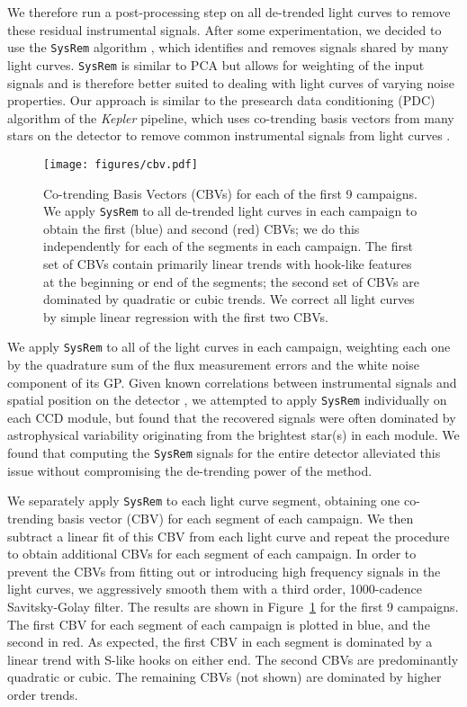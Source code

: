 \documentclass[]{aastex62}
\newcommand{\edited}[1]{{\color{red} #1}}
\begin{document}
We therefore run a post-processing step on all de-trended light curves to remove these
residual instrumental signals. After some experimentation, we decided to use the
\texttt{SysRem} algorithm \citep{Tamuz05}, which identifies and removes signals shared by many
light curves. \texttt{SysRem} is similar to PCA but allows for weighting of the input
signals and is therefore better suited to dealing with light curves of varying noise
properties. Our approach is similar to the presearch data conditioning (PDC) algorithm
of the \emph{Kepler} pipeline, which uses co-trending basis vectors from many stars
on the detector to remove common instrumental signals from light curves \citep{Stumpe12,Smith12}.

\begin{figure}[hbt]
  \begin{center}
      \texttt{[image: figures/cbv.pdf]}
      \caption{Co-trending Basis Vectors (CBVs) for each of the first 9 campaigns.
         We apply \texttt{SysRem} to all de-trended light curves
         in each campaign to obtain the first (blue) and second (red) CBVs; we do this
         independently for each of the segments in each campaign.
         The first set of CBVs contain primarily linear trends with hook-like
         features at the beginning or end of the segments; the second set of CBVs are
         dominated by quadratic or cubic trends. We correct all
         light curves by simple
         linear regression with the first two CBVs.}
     \label{fig:cbv}
  \end{center}
\end{figure}

We apply \texttt{SysRem} to all of the light curves in each campaign, weighting each one
by the quadrature sum of the flux measurement errors and the white noise component of its
GP. Given known correlations between instrumental signals and spatial position on the
detector \citep[e.g.,][]{Petigura12,Wang16}, we attempted to apply \texttt{SysRem} individually
on each CCD module, but found that the recovered signals were often dominated by
astrophysical variability originating from the brightest star(s) in each module.
We found that computing the \texttt{SysRem} signals for the entire detector alleviated
this issue without compromising the de-trending power of the method.

We separately apply \texttt{SysRem} to each light curve segment, obtaining one
co-trending basis vector (CBV) for each segment of each campaign. We then subtract a linear
fit of this CBV from each light curve and repeat the procedure to obtain additional CBVs
for each segment of each campaign. In order to prevent the CBVs from fitting out or
introducing high frequency signals in the light curves, we aggressively smooth them
with a third order, 1000-cadence Savitsky-Golay filter. The results are shown in
Figure~\ref{fig:cbv} \edited{for the first 9 campaigns}. The first CBV for each segment of each campaign is plotted in blue,
and the second in red. As expected, the first CBV in each segment is dominated by a linear trend with S-like
hooks on either end. The second CBVs are predominantly quadratic or cubic. The remaining
CBVs (not shown) are dominated by higher order trends.
\end{document}
